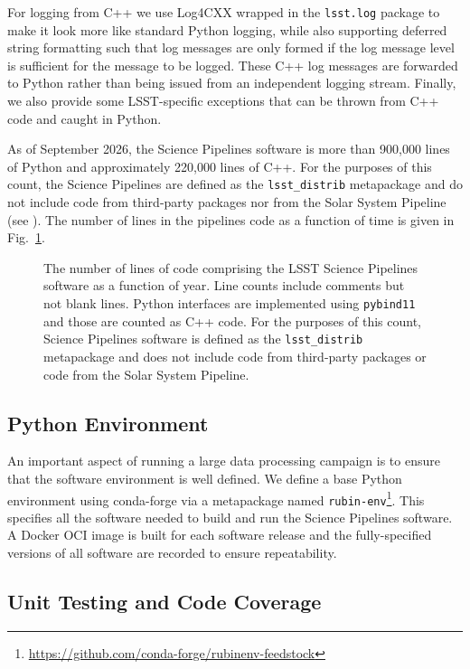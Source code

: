 For logging from C++ we use Log4CXX wrapped in the \texttt{lsst.log} package to make it look more like standard Python logging, while also supporting deferred string formatting such that log messages are only formed if the log message level is sufficient for the message to be logged.
These C++ log messages are forwarded to Python rather than being issued from an independent logging stream.
Finally, we also provide some LSST-specific exceptions that can be thrown from C++ code and caught in Python.

As of September 2026, the Science Pipelines software is more than 900,000 lines of Python and approximately 220,000 lines of C++.
For the purposes of this count, the Science Pipelines are defined as the \texttt{lsst\_distrib} metapackage and do not include code from third-party packages nor from the Solar System Pipeline (see ).
The number of lines in the pipelines code as a function of time is given in Fig.~\ref{fig:pipe-loc}.

\begin{figure}
\caption{The number of lines of code comprising the LSST Science Pipelines software as a function of year.
Line counts include comments but not blank lines. Python interfaces are implemented using \texttt{pybind11} and those are counted as C++ code. For the purposes of this count, Science Pipelines software is defined as the \texttt{lsst\_distrib} metapackage and does not include code from third-party packages or code from the Solar System Pipeline.}
\label{fig:pipe-loc}
\end{figure}

\subsection{Python Environment}
\label{ssec:python}

An important aspect of running a large data processing campaign is to ensure that the software environment is well defined.
We define a base Python environment using conda-forge via a metapackage named \texttt{rubin-env}\footnote{\url{https://github.com/conda-forge/rubinenv-feedstock}}.
This specifies all the software needed to build and run the Science Pipelines software.
A Docker OCI image \citep{merkel2014docker} is built for each software release and the fully-specified versions of all software are recorded to ensure repeatability.

\subsection{Unit Testing and Code Coverage}

